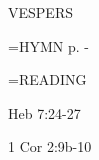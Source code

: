 \begin{flushleft}\normalsize VESPERS\\\end{flushleft}

\hangindent=\parindent \small{\uppercase{HYMN} p. \pageref{easter:firstHymn}-\pageref{easter:lastHymn}\\}

\hangindent=\parindent \small READING
\begin{description}[labelindent=\parindent, leftmargin=*]
\item [1st-6th Week:]     Heb 7:24-27 \textbf{    \\}
\item [7th Week:]     1 Cor 2:9b-10 \textbf{    \\}
\end{description}
